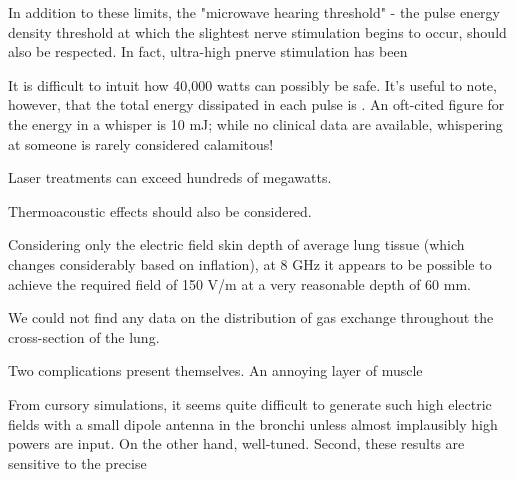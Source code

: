 \documentclass[paper.tex]{subfiles}
\begin{document}
In addition to these limits, the "microwave hearing threshold" - the pulse energy density threshold at which the slightest nerve stimulation begins to occur, should also be respected. In fact, ultra-high pnerve stimulation has been 

It is difficult to intuit how 40,000 watts can possibly be safe. It's useful to note, however, that the total energy dissipated in each pulse is . An oft-cited figure for the energy in a whisper is 10 mJ; while no clinical data are available, whispering at someone is rarely considered calamitous\citationneeded!
 
 Laser treatments can exceed hundreds of megawatts.
 
 
 Thermoacoustic effects should also be considered.
 



Considering only the electric field skin depth\footnotemark\cite{Safety2001}\cite{Physical1982} of average lung tissue\cite{gabriel1996compilation}\cite{Dielectricb}\cite{Dielectric}\cite{Tissue2018} (which changes considerably based on inflation), at 8 GHz it appears to be possible to achieve the required field of 150 V/m at a very reasonable depth of 60 mm. 

We could not find any data on the distribution of gas exchange throughout the cross-section of the lung.

Two complications present themselves. An annoying layer of muscle 


From cursory simulations, it seems quite difficult to generate such high electric fields with a small dipole antenna in the bronchi unless almost implausibly high powers are input. On the other hand, well-tuned. Second, these results are sensitive to the precise

\end{document}

